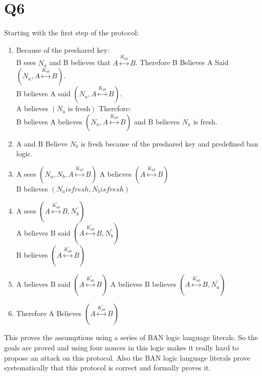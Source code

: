 \documentclass[a4paper, 11pt]{article}
\begin{document}
\section{Q6}
Starting with the first step of the protocol:
\begin{enumerate}
    \item Because of the preshared key: \\
        B sees $N_a$ and B believes that
        $A \stackrel{K_{ab}}{\longleftrightarrow} B$. Therefore B Believes A Said
        $(N_a, A \stackrel{K_{ab}}{\longleftrightarrow} B)$. \\
        B believes A said $(N_a, A \stackrel{K_{ab}}{\longleftrightarrow} B)$. \\
        A believes $(N_a \text{ is fresh})$ Therefore: \\
        B believes A believes $(N_a, A \stackrel{K_{ab}}{\longleftrightarrow} B)$ and
        B believes $N_a$ is fresh.
    \item A and B Believe $N_b$ is fresh because of the preshared key and 
        predefined ban logic.
    \item A sees $(N_a, N_b, A \stackrel{K_{ab}}{\longleftrightarrow} B)$
        A believes $(A \stackrel{K_{ab}}{\longleftrightarrow} B)$ \\
        B believes $(N_a is fresh, N_b is fresh)$
    \item A sees $(A \stackrel{K_{ab}^{\prime}}{\longleftrightarrow} B,
        N^{\prime}_{b})$ \\
        A believes B said $(A \stackrel{K_{ab}^{\prime}}{\longleftrightarrow} B,
        N_{b}^{\prime})$ \\
        B believes $(A \stackrel{K_{ab}^{\prime}}{\longleftrightarrow} B)$
    \item A believes B said $(A \stackrel{K_{ab}^{\prime}}{\longleftrightarrow} B)$
        A believes B believes $(A \stackrel{K_{ab}^{\prime}}{\longleftrightarrow} B, N_{a}^{\prime})$ \\
    \item Therefore A Believes $(A \stackrel{K_{ab}^{\prime}}{\longleftrightarrow} B)$
\end{enumerate}
This proves the assumptions using a series of BAN logic language literals.
So the goals are proved and using four nonces in this logic makes it really
hard to propose an attack on this protocol. Also the BAN logic language
literals prove systematically that this protocol is correct and formally
proves it.
\end{document}
